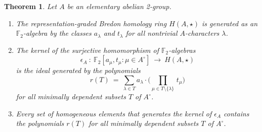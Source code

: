 \documentclass{amsart}[12pt]
\newcommand{\mF}{{\mathbb F}}
\renewcommand{\to}{\longrightarrow}
\numberwithin{equation}{section}
\newtheorem{theorem}[equation]{Theorem}
\theoremstyle{definition}
\begin{document}
\begin{theorem}\label{thm:Bredon_RO-graded}
  Let $A$ be an elementary abelian 2-group.
  \begin{enumerate}[\em (i)]
  \item
    The representation-graded Bredon homology ring $H(A,\star)$
    is generated as an $\mF_2$-algebra
    by the classes $a_\lambda$ and $t_\lambda$ for all nontrivial $A$-characters $\lambda$.
\item 
  The kernel of the surjective homomorphism of $\mF_2$-algebras
  \[ \epsilon_A \ : \  \mF_2[a_\mu,t_\mu\colon \mu\in A^\circ] \ \to \ H(A,\star) \]
  is the ideal generated by the polynomials
  \[  r(T)\ = \
    \sum_{\lambda\in T}  a_\lambda \cdot\bigg( \prod_{\mu\in T\setminus\{\lambda\}}\, t_\mu\bigg) \]
  for all minimally dependent subsets $T$ of $A^\circ$.
\item
  Every set of homogeneous elements that generates the kernel
  of $\epsilon_A$ contains the polynomials $r(T)$
 for all minimally dependent subsets $T$ of $A^\circ$.
\end{enumerate}
\end{theorem}
\end{document}
